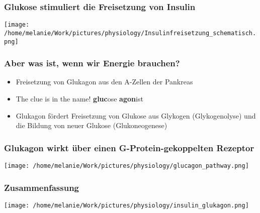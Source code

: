\documentclass{beamer}
\begin{document}
\begin{frame}
\frametitle{Glukose stimuliert die Freisetzung von Insulin}

\begin{center}
\texttt{[image: /home/melanie/Work/pictures/physiology/Insulinfreisetzung\_schematisch.png]}
\end{center}


\end{frame}


\begin{frame}
\frametitle{Aber was ist, wenn wir Energie brauchen?}

\pause

\begin{itemize}
\item
Freisetzung von Glukagon aus den A-Zellen der Pankreas
\item
  The clue is in the name! \textbf{gluc}ose \textbf{agon}ist 
\item
Glukagon fördert Freisetzung von Glukose aus Glykogen (Glykogenolyse) und die Bildung von neuer Glukose (Glukoneogenese)
\end{itemize}
\end{frame}




\begin{frame}
\frametitle{Glukagon wirkt über einen G-Protein-gekoppelten Rezeptor}

\begin{center}
\texttt{[image: /home/melanie/Work/pictures/physiology/glucagon\_pathway.png]}
\end{center}


\end{frame}



\begin{frame}
\frametitle{Zusammenfassung}

\begin{center}
\texttt{[image: /home/melanie/Work/pictures/physiology/insulin\_glukagon.png]}
\end{center}


\end{frame}
\end{document}
